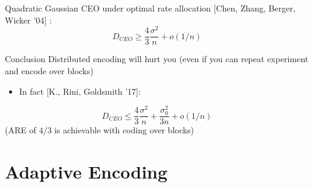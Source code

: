 \documentclass[mathserif]{beamer}
\begin{document}
\begin{frame}
Quadratic Gaussian CEO under optimal rate allocation [Chen, Zhang, Berger, Wicker '04] :
\[
 D_{CEO}  \geq \frac{4}{3} \frac{\sigma^2}{n} + o(1/n) 
\]
\pause
\begin{alertblock}{Conclusion}
Distributed encoding will hurt you (even if you can repeat experiment and encode over blocks)
\end{alertblock}
\bigskip
\pause
\begin{itemize}
\item In fact [K., Rini, Goldsmith '17]:
\end{itemize} 
\[
 D_{CEO} \leq \frac{4}{3} \frac{\sigma^2}{n} + \frac{\sigma_0^2}{3n} + o(1/n) 
\]
(ARE of $4/3$ is achievable with coding over blocks)
\end{frame}

\section{Adaptive Encoding} 
\end{document}
